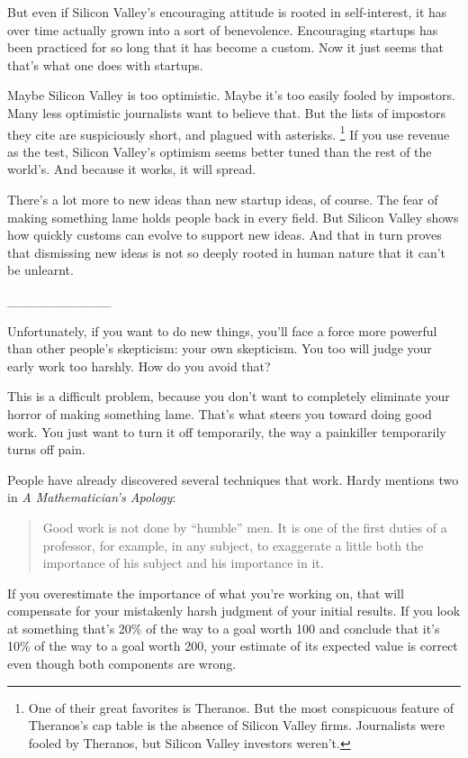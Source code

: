 \documentclass[12pt]{book}
\begin{document}
But even if Silicon Valley's encouraging attitude is rooted in
self-interest, it has over time actually grown into a sort of
benevolence. Encouraging startups has been practiced for so long that it
has become a custom. Now it just seems that that's what one does with
startups.

Maybe Silicon Valley is too optimistic. Maybe it's too easily fooled by
impostors. Many less optimistic journalists want to believe that. But
the lists of impostors they cite are suspiciously short, and plagued
with asterisks. \footnote{One of their great favorites is Theranos. But the most
conspicuous feature of Theranos's cap table is the absence of Silicon
Valley firms. Journalists were fooled by Theranos, but Silicon Valley
investors weren't.} If you use revenue as the test,
Silicon Valley's optimism seems better tuned than the rest of the
world's. And because it works, it will spread.

There's a lot more to new ideas than new startup ideas, of course. The
fear of making something lame holds people back in every field. But
Silicon Valley shows how quickly customs can evolve to support new
ideas. And that in turn proves that dismissing new ideas is not so
deeply rooted in human nature that it can't be unlearnt.

\_\_\_\_\_\_\_\_\_\_\_

Unfortunately, if you want to do new things, you'll face a force more
powerful than other people's skepticism: your own skepticism. You too
will judge your early work too harshly. How do you avoid that?

This is a difficult problem, because you don't want to completely
eliminate your horror of making something lame. That's what steers you
toward doing good work. You just want to turn it off temporarily, the
way a painkiller temporarily turns off pain.

People have already discovered several techniques that work. Hardy
mentions two in \emph{A Mathematician's Apology}:

\begin{quote}
Good work is not done by ``humble'' men. It is one of the first duties
of a professor, for example, in any subject, to exaggerate a little both
the importance of his subject and his importance in it.
\end{quote}

If you overestimate the importance of what you're working on, that will
compensate for your mistakenly harsh judgment of your initial results.
If you look at something that's 20\% of the way to a goal worth 100 and
conclude that it's 10\% of the way to a goal worth 200, your estimate of
its expected value is correct even though both components are wrong.
\end{document}
